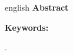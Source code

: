 \vspace{-5mm}{\color{Sobrac23}\rule{\textwidth}{0.4pt}}
\ResumoTexto
\begin{otherlanguage*}{english}
{\EnglishTitle}
		{\textbf{Abstract}} \vspace{3pt}
		
		{\fontsize{11}{12.5}\selectfont
		\AbstractArtigo
		\par}
		\vspace{0.5\baselineskip} \fontsize{11}{12}\selectfont
		\textbf{Keywords: }{\fontsize{11}{12}\selectfont 
		\KeywordsArtigo.
		\par}
	  \vspace{4mm}
\end{otherlanguage*}		
\pagestyle{plain}
\par\fontsize{12}{13}\selectfont 
\singlespacing
